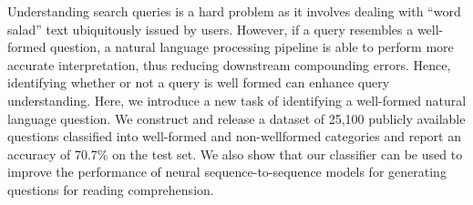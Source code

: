 Understanding search queries is a hard problem as it involves dealing with ``word salad'' text ubiquitously issued by users. However, if a query resembles a well-formed question, a natural language processing pipeline is able to perform more accurate interpretation, thus reducing downstream compounding errors. Hence, identifying whether or not a query is well formed can enhance query understanding. Here, we introduce a new task of identifying a well-formed natural language question. We construct and release a dataset of 25,100 publicly available questions classified into well-formed and non-wellformed categories and report an accuracy of 70.7\% on the test set. We also show that our classifier can be used to improve the performance of neural sequence-to-sequence models for generating questions for reading comprehension.

